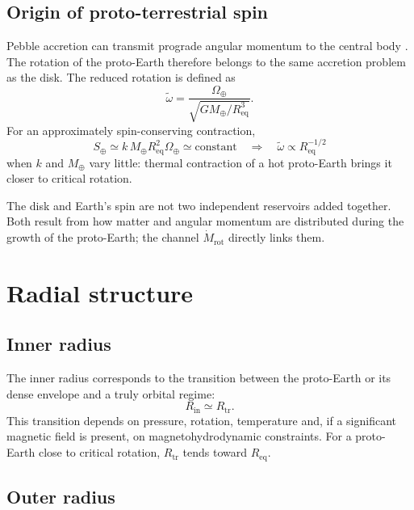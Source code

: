 \documentclass[11pt,a4paper,openany]{report}
\newcommand{\Mt}{M_{\oplus}}
\newcommand{\Req}{R_{\mathrm{eq}}}
\begin{document}
\subsection{Origin of proto-terrestrial spin}

Pebble accretion can transmit prograde angular momentum to the central body
\cite{JohansenLacerda2010,Visser2020}. The rotation of the proto-Earth therefore belongs to the
same accretion problem as the disk. The reduced rotation is defined as
\begin{equation}
\tilde\omega=\frac{\Omega_\oplus}{\sqrt{G\Mt/\Req^3}}.
\label{eq:omegatilde}
\end{equation}
For an approximately spin-conserving contraction,
\begin{equation}
S_\oplus\simeq k\,\Mt\Req^2\Omega_\oplus\simeq\text{constant}
\quad\Longrightarrow\quad
\tilde\omega\propto\Req^{-1/2}
\label{eq:spin}
\end{equation}
when $k$ and $\Mt$ vary little: thermal contraction of a hot proto-Earth brings it closer to
critical rotation.

\begin{ideephys}
The disk and Earth's spin are not two independent reservoirs added together. Both result from how
matter and angular momentum are distributed during the growth of the proto-Earth; the channel
$\dot M_{\mathrm{rot}}$ directly links them.
\end{ideephys}

\section{Radial structure}
\subsection{Inner radius}

The inner radius corresponds to the transition between the proto-Earth or its dense envelope and a
truly orbital regime:
\begin{equation}
R_{\mathrm{in}}\simeq R_{\mathrm{tr}}.
\label{eq:Rin}
\end{equation}
This transition depends on pressure, rotation, temperature and, if a significant magnetic field is
present, on magnetohydrodynamic constraints. For a proto-Earth close to critical rotation,
$R_{\mathrm{tr}}$ tends toward $\Req$.

\subsection{Outer radius}
\end{document}
